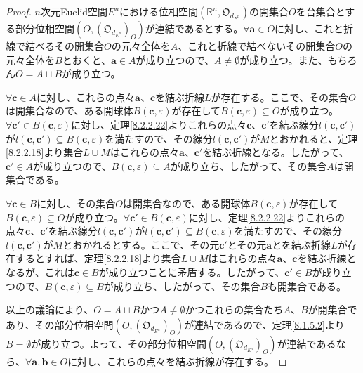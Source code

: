 \documentclass[dvipdfmx]{jsarticle}
\begin{document}
\begin{proof}
$n$次元Euclid空間$E^{n}$における位相空間$\left( \mathbb{R}^{n},\mathfrak{O}_{d_{E^{n}}} \right)$の開集合$O$を台集合とする部分位相空間$\left( O,\left( \mathfrak{O}_{d_{E^{n}}} \right)_{O} \right)$が連結であるとする。$\forall\mathbf{a} \in O$に対し、これと折線で結べるその開集合$O$の元々全体を$A$、これと折線で結べないその開集合$O$の元々全体を$B$とおくと、$\mathbf{a} \in A$が成り立つので、$A \neq \emptyset$が成り立つ。また、もちろん$O = A \sqcup B$が成り立つ。\par
$\forall\mathbf{c} \in A$に対し、これらの点々$\mathbf{a}$、$\mathbf{c}$を結ぶ折線$L$が存在する。ここで、その集合$O$は開集合なので、ある開球体$B\left( \mathbf{c},\varepsilon \right)$が存在して$B\left( \mathbf{c},\varepsilon \right) \subseteq O$が成り立つ。$\forall\mathbf{c}' \in B\left( \mathbf{c},\varepsilon \right)$に対し、定理\ref{8.2.2.22}よりこれらの点々$\mathbf{c}$、$\mathbf{c}'$を結ぶ線分$l\left( \mathbf{c},\mathbf{c}' \right)$が$l\left( \mathbf{c},\mathbf{c}' \right) \subseteq B\left( \mathbf{c},\varepsilon \right)$を満たすので、その線分$l\left( \mathbf{c},\mathbf{c}' \right)$が$M$とおかれると、定理\ref{8.2.2.18}より集合$L \cup M$はこれらの点々$\mathbf{a}$、$\mathbf{c}'$を結ぶ折線となる。したがって、$\mathbf{c}' \in A$が成り立つので、$B\left( \mathbf{c},\varepsilon \right) \subseteq A$が成り立ち、したがって、その集合$A$は開集合である。\par
$\forall\mathbf{c} \in B$に対し、その集合$O$は開集合なので、ある開球体$B\left( \mathbf{c},\varepsilon \right)$が存在して$B\left( \mathbf{c},\varepsilon \right) \subseteq O$が成り立つ。$\forall\mathbf{c}' \in B\left( \mathbf{c},\varepsilon \right)$に対し、定理\ref{8.2.2.22}よりこれらの点々$\mathbf{c}$、$\mathbf{c}'$を結ぶ線分$l\left( \mathbf{c},\mathbf{c}' \right)$が$l\left( \mathbf{c},\mathbf{c}' \right) \subseteq B\left( \mathbf{c},\varepsilon \right)$を満たすので、その線分$l\left( \mathbf{c},\mathbf{c}' \right)$が$M$とおかれるとする。ここで、その元$\mathbf{c}'$とその元$\mathbf{a}$とを結ぶ折線$L$が存在するとすれば、定理\ref{8.2.2.18}より集合$L \cup M$はこれらの点々$\mathbf{a}$、$\mathbf{c}$を結ぶ折線となるが、これは$\mathbf{c} \in B$が成り立つことに矛盾する。したがって、$\mathbf{c}' \in B$が成り立つので、$B\left( \mathbf{c},\varepsilon \right) \subseteq B$が成り立ち、したがって、その集合$B$も開集合である。\par
以上の議論により、$O = A \sqcup B$かつ$A \neq \emptyset$かつこれらの集合たち$A$、$B$が開集合であり、その部分位相空間$\left( O,\left( \mathfrak{O}_{d_{E^{n}}} \right)_{O} \right)$が連結であるので、定理\ref{8.1.5.2}より$B = \emptyset$が成り立つ。よって、その部分位相空間$\left( O,\left( \mathfrak{O}_{d_{E^{n}}} \right)_{O} \right)$が連結であるなら、$\forall\mathbf{a},\mathbf{b} \in O$に対し、これらの点々を結ぶ折線が存在する。
\end{proof}
\end{document}
